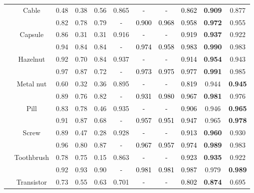 \documentclass{bmvc2k}
\newcommand{\wgd}[1]{\textcolor{black}{{}#1}}
\begin{document}
\begin{table*}[!t]
\begin{adjustbox}{width=0.95\textwidth}
\begin{threeparttable}
\begin{tabular}{c|c|c c c c c c c c c}
			&\multirow{2}{*}{Cable}   & 0.48  & 0.38  & 0.56  & 0.865 & \wgd{-}     & \wgd{-}     & \wgd{0.862} & \textbf{0.909} & 0.877 \\
		                         &    & 0.82  & 0.78  & 0.79  & -     & \wgd{0.900} & \wgd{0.968} & \wgd{0.958} & \textbf{0.972} & 0.955 \\ \cline{2-11} 
			&\multirow{2}{*}{Capsule} & 0.86  & 0.31  & 0.31  & 0.916 & \wgd{-}     & \wgd{-}     & \wgd{0.919} & \textbf{0.937} & 0.922 \\
			                     &    & 0.94  & 0.84  & 0.84  & -     & \wgd{0.974} & \wgd{0.958} & \wgd{0.983} & \textbf{0.990} & 0.983 \\ \cline{2-11} 
			&\multirow{2}{*}{Hazelnut}& 0.92  & 0.70  & 0.84  & 0.937 & \wgd{-}     & \wgd{-}     & \wgd{0.914} & \textbf{0.954} & 0.943 \\
			                     &    & 0.97  & 0.87  & 0.72  & -     & \wgd{0.973} & \wgd{0.975} & \wgd{0.977} & \textbf{0.991} & 0.985 \\ \cline{2-11} 
			&\multirow{2}{*}{Metal nut}&0.60  & 0.32  & 0.36  & 0.895 & \wgd{-}     & \wgd{-}     & \wgd{0.819} & 0.944 & \textbf{0.945} \\
			                     &    & 0.89  & 0.76  & 0.82  & -     & \wgd{0.931} & \wgd{0.980} & \wgd{0.967} & \textbf{0.981} & 0.976 \\ \cline{2-11} 
			&\multirow{2}{*}{Pill}    & 0.83  & 0.78  & 0.46  & 0.935 & \wgd{-}     & \wgd{-}     & \wgd{0.906} & 0.946 & \textbf{0.965} \\
			                     &    & 0.91  & 0.87  & 0.68  & -     & \wgd{0.957} & \wgd{0.951} & \wgd{0.947} & 0.965 & \textbf{0.978} \\ \cline{2-11} 
			&\multirow{2}{*}{Screw}   & 0.89  & 0.47  & 0.28  & 0.928 & \wgd{-}     & \wgd{-}     & \wgd{0.913} & \textbf{0.960} & 0.930 \\
			                     &    & 0.96  & 0.80  & 0.87  & -     & \wgd{0.967} & \wgd{0.957} & \wgd{0.974} & \textbf{0.989} & 0.983 \\ \cline{2-11}
			&\multirow{2}{*}{Toothbrush}& 0.78 & 0.75 & 0.15  & 0.863 & \wgd{-}     & \wgd{-}     & \wgd{0.923} & \textbf{0.935} & 0.922 \\   
			                     &    & 0.92  & 0.93  & 0.90  & -     & \wgd{0.981} & \wgd{0.981} & \wgd{0.987} & 0.979 & \textbf{0.989} \\ \cline{2-11}
			&\multirow{2}{*}{Transistor}& 0.73 & 0.55 & 0.63  & 0.701 & \wgd{-}     & \wgd{-}     & \wgd{0.802} & \textbf{0.874} & 0.695 \\

\end{tabular}
\end{threeparttable}
\end{adjustbox}
\end{table*}
\end{document}

